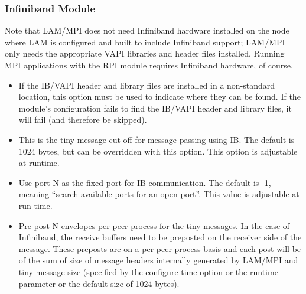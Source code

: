 
\subsubsection{Infiniband  Module}
\label{sec:configure:ssi:options:ib}


Note that LAM/MPI does not need Infiniband hardware installed on the
node where LAM is configured and built to include Infiniband support;
LAM/MPI only needs the appropriate VAPI libraries and header files
installed.  Running MPI applications with the  RPI module
requires Infiniband hardware, of course.

\begin{itemize}

\item {}
  
  If the IB/VAPI header and library files are installed in a non-standard
  location, this option must be used to indicate where they can be
  found.  If the  module's configuration fails to find the IB/VAPI
  header and library files, it will fail (and therefore be skipped).


\item {}

  This is the tiny message cut-off for message passing using IB.  The
  default is 1024 bytes, but can be overridden with this
  option.  This option is adjustable at runtime.


\item {}

  Use port N as the fixed port for IB communication.  The default is
  -1, meaning ``search available ports for an open port''.  This value
  is adjustable at run-time.


\item {} 

  Pre-post N envelopes per peer process for the tiny messages.  In the
  case of Infiniband, the receive buffers need to be preposted on the
  receiver side of the message.  These preposts are on a per peer
  process basis and each post will be of the sum of size of message
  headers internally generated by LAM/MPI and tiny message size (specified
  by the configure time  option or the
  runtime  parameter or the default size
  of 1024 bytes).


\end{itemize}

